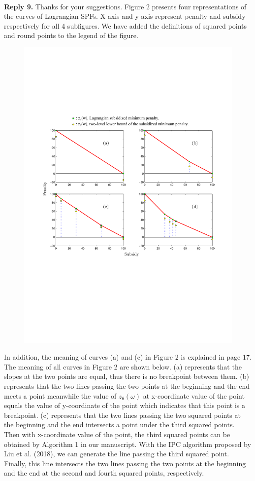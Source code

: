\documentclass[11pt]{article}
\begin{document}
~\\[2mm]
\noindent \textbf{Reply 9.}
Thanks for your suggestions. Figure 2 presents four representations of the curves of Lagrangian SPFs. X axis and y axis represent penalty and subsidy respectively for all 4 subfigures. We have added the definitions of squared points and round points to the legend of the figure.
\begin{figure}[H]
\centering
\includegraphics[width=1\textwidth]{1.pdf}
\centering
\end{figure}
In addition, the meaning of curves (a) and (c) in Figure 2 is explained in page 17.
The meaning of all curves in Figure 2 are shown below. (a) represents that the slopes at the two points are equal, thus there is no breakpoint between them. (b) represents that the two lines passing the two points at the beginning and the end meets a point meanwhile the value of $z_\theta(\omega)$ at x-coordinate value of the point equals the value of y-coordinate of the point which indicates that this point is a breakpoint. (c) represents that the two lines passing the two squared points at the beginning and the end intersects a point under the third squared points. Then with x-coordinate value of the point, the third squared points can be obtained by Algorithm 1 in our manuscript. With the IPC algorithm proposed by Liu et al. (2018), we can generate the line passing the third squared point. Finally, this line intersects the two lines passing the two points at the beginning and the end at the second and fourth squared points, respectively.
\end{document}
